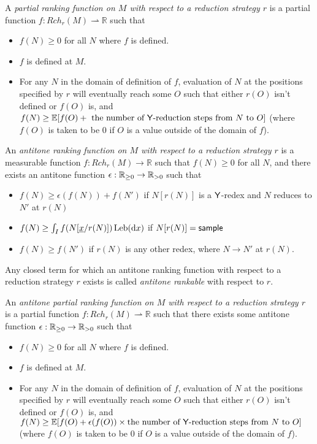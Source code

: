 \begin{definition}
A \emph{partial ranking function on $M$ with respect to a reduction strategy $r$} is a partial function $f : Rch_r(M) \rightharpoonup \mathbb R$ such that
\begin{itemize}
    \item $f(N) \geq 0$ for all $N$ where $f$ is defined.
    \item $f$ is defined at $M$.
    \item For any $N$ in the domain of definition of $f$, evaluation of $N$ at the positions specified by $r$ will eventually reach some $O$ such that either $r(O)$ isn't defined or $f(O)$ is, and $f(N) \geq \mathbb E[f(O) + \text{ the number of $\mathsf{Y}$-reduction steps from $N$ to $O$}]$ (where $f(O)$ is taken to be 0 if $O$ is a value outside of the domain of $f$).
\end{itemize}
\end{definition}

\begin{definition}\rm
An \emph{antitone ranking function on $M$ with respect to a reduction strategy $r$} is a measurable function $f:\mathit{Rch}_r(M) \to \mathbb{R}$ such that $f(N) \geq 0$ for all $N$, and there exists an antitone function $\epsilon : \mathbb{R}_{{\geq}0} \to \mathbb{R}_{{>}0}$ such that
\begin{itemize}
    \item $f(N) \geq \epsilon(f(N)) + f(N')$ if $N[r(N)]$ is a $\mathsf{Y}$-redex and $N$ reduces to $N'$ at $r(N)$
    \item $f(N) \geq \int_I f(N[\underline{x}/r(N)]) \, \mathrm{Leb}(\mathrm{d}x)$ if $N[r(N)] = \mathsf{sample}$

    \item $f(N) \geq f(N')$ if $r(N)$ is any other redex, where $N \to N'$ at $r(N)$.
\end{itemize}
Any closed term for which an antitone ranking function with respect to a reduction strategy $r$ exists is called \emph{antitone rankable} with respect to $r$. 
\end{definition}

\begin{definition}
An \emph{antitone partial ranking function on $M$ with respect to a reduction strategy $r$} is a partial function $f : Rch_r(M) \rightharpoonup \mathbb R$ such that there exists some antitone function $\epsilon : \mathbb{R}_{{\geq}0} \to \mathbb{R}_{{>}0}$ such that
\begin{itemize}
    \item $f(N) \geq 0$ for all $N$ where $f$ is defined.
    \item $f$ is defined at $M$.
    \item For any $N$ in the domain of definition of $f$, evaluation of $N$ at the positions specified by $r$ will eventually reach some $O$ such that either $r(O)$ isn't defined or $f(O)$ is, and $f(N) \geq \mathbb E[f(O) + \epsilon(f(O)) \times \text{the number of $\mathsf{Y}$-reduction steps from $N$ to $O$}]$ (where $f(O)$ is taken to be 0 if $O$ is a value outside of the domain of $f$).
\end{itemize}
\end{definition}

